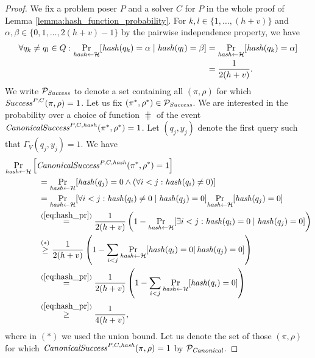 \begin{proof}
We fix a problem poser $P$ and a solver $C$ for $P$ in the whole proof of Lemma \ref{lemma:hash_function_probability}.
For $k,l \in \{1, \dotsc, (h+v)\}$ and $\alpha,\beta \in \{0,1,\dotsc,2(h+v)-1\}$ by the pairwise independence property, we have
\begin{align}
  \label{eq:hash_pr}
 \forall q_k \neq q_l \in Q : \underset{\operatorname{\mathit{hash}} \leftarrow \mathcal{H}}{\Pr}[\operatorname{\mathit{hash}}(q_k) = \alpha \mid \operatorname{\mathit{hash}}(q_l) = \beta] &=
 \underset{\operatorname{\mathit{hash}} \leftarrow \mathcal{H}}{\Pr}[\operatorname{\mathit{hash}}(q_k) = \alpha] \notag\\
 &= \frac{1}{2(h+v)}.
\end{align}
%
We write $\mathcal{P}_{\operatorname{\mathit{Success}}}$ to denote a set containing all $(\pi,\rho)$ for which $\operatorname{\mathit{Success}}^{P, C}(\pi, \rho) = 1$.
Let us fix $(\pi^*, \rho^*) \in \mathcal{P}_{\mathit{Success}}$. We are interested in the probability over
a choice of function $\hash$ of the event $\operatorname{\mathit{CanonicalSuccess}}^{P,C,\operatorname{\mathit{hash}}}(\pi^*, \rho^*) = 1$.
Let $(q_j, y_j)$ denote the first query such that $\Gamma_V(q_j, y_j) = 1$. We have
\begin{align}
  \label{ineq:prob_hash_success}
  &\underset{\operatorname{\mathit{hash}} \leftarrow \mathcal{H}}{\Pr}\left[\operatorname{\mathit{CanonicalSuccess}}^{P,C,\operatorname{\mathit{hash}}}(\pi^*, \rho^*) = 1\right] \notag\\
  &\mbox\qquad\qquad = \underset{\operatorname{\mathit{hash}} \leftarrow \mathcal{H}}{\Pr}[\operatorname{\mathit{hash}}(q_j) = 0 \land (\forall i < j : \operatorname{\mathit{hash}}(q_i) \neq 0)] \notag\\
  &\mbox\qquad\qquad = \underset{\operatorname{\mathit{hash}} \leftarrow \mathcal{H}}{\Pr}[
  \forall i < j : \operatorname{\mathit{hash}}(q_i) \neq 0 \mid \operatorname{\mathit{hash}}(q_j) = 0] \underset{\operatorname{\mathit{hash}} \leftarrow \mathcal{H}}{\Pr}[\operatorname{\mathit{hash}}(q_j) = 0] \notag\\
  &\mbox\qquad\qquad \stackrel{(\ref{eq:hash_pr})}{=} \frac{1}{2(h+v)}\left(1 -\underset{\operatorname{\mathit{hash}} \leftarrow \mathcal{H}}{\Pr}[\exists i < j : \operatorname{\mathit{hash}}(q_i) = 0 \mid \operatorname{\mathit{hash}}(q_j) = 0] \right) \notag\\
  &\mbox\qquad\qquad \stackrel{(*)}{\geq} \frac{1}{2(h+v)} \left( 1 - \sum_{i < j} \underset{\operatorname{\mathit{hash}} \leftarrow \mathcal{H}}{\Pr}[\operatorname{\mathit{hash}}(q_i) = 0 | \operatorname{\mathit{hash}}(q_j) = 0] \right) \notag\\
  &\mbox\qquad\qquad \stackrel{(\ref{eq:hash_pr})}{=} \frac{1}{2(h+v)} \left( 1 -  \sum_{i < j}\underset{\operatorname{\mathit{hash}} \leftarrow \mathcal{H}}{\Pr}[\operatorname{\mathit{hash}}(q_i) = 0] \right) \notag\\
  &\mbox\qquad\qquad \stackrel{(\ref{eq:hash_pr})}{\geq} \frac{1}{4(h+v)},
\end{align}
where in $(*)$ we used the union bound.
Let us denote the set of those $(\pi,\rho)$ for which \linebreak
 $\operatorname{\mathit{CanonicalSuccess}}^{P, C, \operatorname{\mathit{hash}}}(\pi, \rho) = 1$ by $\mathcal{P}_{\mathit{Canonical}}$.

\end{proof}
